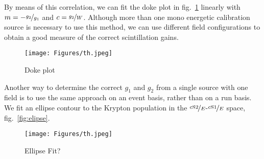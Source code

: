 By means of this correlation, we can fit the doke plot in fig.~\ref{fig:doke} linearly with $ m = - \nicefrac{g_2}{g_1} $ and $ c = \nicefrac{g_2}{W} $.  %
Although more than one mono energetic calibration source is necessary to use this method, we can use different field configurations to obtain a good measure of the correct scintillation gains.

\begin{figure}
\centering
\texttt{[image: Figures/th.jpeg]}  %
\caption[Doke plot]{
    Doke plot
    }
\label{fig:doke}
\end{figure}

Another way to determine the correct $ g_1 $ and $ g_2 $ from a single source with one field is to use the same approach on an event basis, rather than on a run basis.
We fit an ellipse contour to the Krypton population in the $ \nicefrac{\mathrm{cS2}}{E} $-$ \nicefrac{\mathrm{cS1}}{E} $ space, fig.~\ref{fig:elipse}.

\begin{figure}
\centering
\texttt{[image: Figures/th.jpeg]}  %
\caption[Ellipse Fit]{
        Ellipse Fit?
    }
\label{fig:ellipse}
\end{figure}



